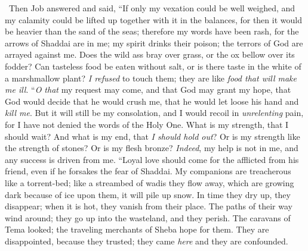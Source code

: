 \begin{biblechapter} %
  Then Job answered and said,
\verse “If only my vexation could be well weighed, 
and my calamity could be lifted up together with it in the balances,
\verse for then it would be heavier than the sand of the seas; 
therefore my words have been rash,
\verse for the arrows of Shaddai are in me; 
my spirit drinks their poison; 
the terrors of God are arrayed against me.
\verse Does the wild ass bray over grass, 
or the ox bellow over its fodder?
\verse Can tasteless food be eaten without salt, 
or is there taste in the white of a marshmallow plant?
\verse \textit{I refused} to touch them; 
they are like \textit{food that will make me ill}.
\verse “\textit{O that} my request may come, 
and that God may grant my hope,
\verse that God would decide that he would crush me, 
that he would let loose his hand and \textit{kill me}.
\verse But it will still be my consolation, 
and I would recoil in \textit{unrelenting} pain, 
for I have not denied the words of the Holy One.
\verse What is my strength, that I should wait? 
And what is my end, that \textit{I should hold out}?
\verse Or is my strength like the strength of stones? 
Or is my flesh bronze?
\verse \textit{Indeed}, my help is not in me, 
and any success is driven from me.
\verse “Loyal love should come for the afflicted from his friend, 
even if he forsakes the fear of Shaddai.
\verse My companions are treacherous like a torrent-bed; 
like a streambed of wadis they flow away,
\verse which are growing dark because of ice upon them, 
it will pile up snow.
\verse In time they dry up, they disappear; 
when it is hot, they vanish from their place.
\verse The paths of their way wind around; 
they go up into the wasteland, and they perish.
\verse The caravans of Tema looked; 
the traveling merchants of Sheba hope for them.
\verse They are disappointed, because they trusted; 
they came \textit{here} and they are confounded.

\end{biblechapter}
